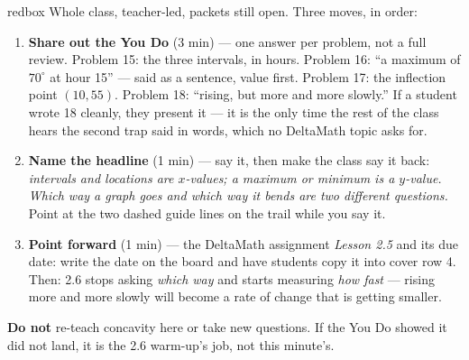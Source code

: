 \documentclass[10pt]{article}
\begin{document}
\boxguard[20]
\begin{skillbox}{redbox}
Whole class, teacher-led, packets still open. Three moves, in order:
\begin{enumerate}[itemsep=3pt]
  \item \textbf{Share out the You Do} (3 min) --- one answer per problem, not a full review.
        Problem 15: the three intervals, in hours. Problem 16: ``a maximum of $70^\circ$ at
        hour 15'' --- said as a sentence, value first. Problem 17: the inflection point
        $(10, 55)$. Problem 18: ``rising, but more and more slowly.'' If a student wrote 18
        cleanly, they present it --- it is the only time the rest of the class hears the
        second trap said in words, which no DeltaMath topic asks for.
  \item \textbf{Name the headline} (1 min) --- say it, then make the class say it back:
        \textit{intervals and locations are $x$-values; a maximum or minimum is a $y$-value.
        Which way a graph goes and which way it bends are two different questions.} Point at
        the two dashed guide lines on the trail while you say it.
  \item \textbf{Point forward} (1 min) --- the DeltaMath assignment \textit{Lesson 2.5} and its
        due date: write the date on the board and have students copy it into cover row 4.
        Then: 2.6 stops asking \emph{which way} and starts measuring \emph{how fast} --- rising
        more and more slowly will become a rate of change that is getting smaller.
\end{enumerate}
\textbf{Do not} re-teach concavity here or take new questions. If the You Do showed it did not
land, it is the 2.6 warm-up's job, not this minute's.
\end{skillbox}
\end{document}
